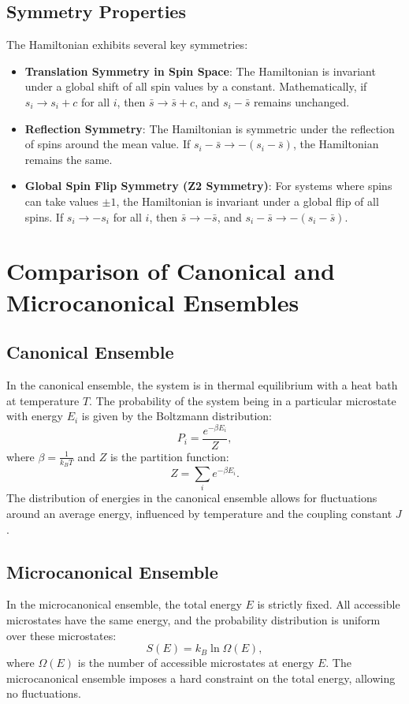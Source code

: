 \documentclass{article}
\begin{document}
\subsection{Symmetry Properties}
The Hamiltonian exhibits several key symmetries:
\begin{itemize}
    \item \textbf{Translation Symmetry in Spin Space}: The Hamiltonian is invariant under a global shift of all spin values by a constant. Mathematically, if \( s_i \to s_i + c \) for all \( i \), then \( \bar{s} \to \bar{s} + c \), and \( s_i - \bar{s} \) remains unchanged.
    \item \textbf{Reflection Symmetry}: The Hamiltonian is symmetric under the reflection of spins around the mean value. If \( s_i - \bar{s} \to - (s_i - \bar{s}) \), the Hamiltonian remains the same.
    \item \textbf{Global Spin Flip Symmetry (Z2 Symmetry)}: For systems where spins can take values \(\pm 1\), the Hamiltonian is invariant under a global flip of all spins. If \( s_i \to -s_i \) for all \( i \), then \( \bar{s} \to -\bar{s} \), and \( s_i - \bar{s} \to - (s_i - \bar{s}) \).
\end{itemize}

\section{Comparison of Canonical and Microcanonical Ensembles}
\subsection{Canonical Ensemble}
In the canonical ensemble, the system is in thermal equilibrium with a heat bath at temperature \( T \). The probability of the system being in a particular microstate with energy \( E_i \) is given by the Boltzmann distribution:
\begin{equation}
P_i = \frac{e^{-\beta E_i}}{Z},
\end{equation}
where \( \beta = \frac{1}{k_B T} \) and \( Z \) is the partition function:
\begin{equation}
Z = \sum_i e^{-\beta E_i}.
\end{equation}
The distribution of energies in the canonical ensemble allows for fluctuations around an average energy, influenced by temperature and the coupling constant \( J \).

\subsection{Microcanonical Ensemble}
In the microcanonical ensemble, the total energy \( E \) is strictly fixed. All accessible microstates have the same energy, and the probability distribution is uniform over these microstates:
\begin{equation}
S(E) = k_B \ln \Omega(E),
\end{equation}
where \( \Omega(E) \) is the number of accessible microstates at energy \( E \). The microcanonical ensemble imposes a hard constraint on the total energy, allowing no fluctuations.
\end{document}
